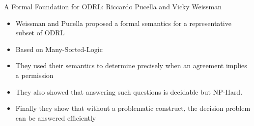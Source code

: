 \documentclass{beamer}
\begin{document}



\begin{frame}[fragile]{A Formal Foundation for ODRL: \newline Riccardo Pucella and Vicky Weissman}
\begin{itemize}
  \item Weissman and Pucella proposed a formal semantics for a representative subset of ODRL
  \item Based on Many-Sorted-Logic
  \item They used their semantics to determine precisely when an agreement implies a permission
  \item They also showed that answering such questions is decidable but NP-Hard.
  \item Finally they show that without a problematic construct, the decision problem can be answered efficiently
  \end{itemize}
\end{frame}
\end{document}

